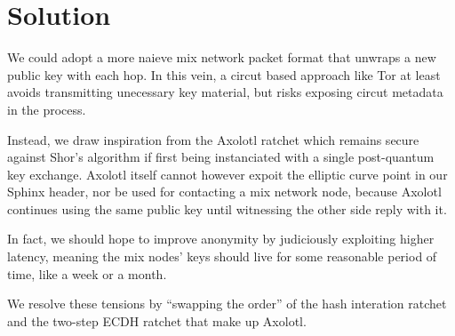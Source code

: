 \documentclass[twoside,letterpaper]{sig-alternate}
\begin{document}
\section{Solution}

We could adopt a more naieve mix network packet format that unwraps
a new public key with each hop.  In this vein, a circut based approach
like Tor at least avoids transmitting unecessary key material, but
risks exposing circut metadata in the process. 

Instead, we draw inspiration from the Axolotl ratchet %
which remains secure against Shor's algorithm if first being instanciated
with a single post-quantum key exchange. 
%
Axolotl itself cannot however expoit the elliptic curve point in
 our Sphinx header, nor be used for contacting a mix network node, 
because Axolotl continues using the same public key until witnessing
 the other side reply with it.

In fact, we should hope to improve anonymity by judiciously exploiting
higher latency, meaning the mix nodes' keys should live for some
reasonable period of time, like a week or a month.

We resolve these tensions by ``swapping the order'' of the hash interation
ratchet and the two-step ECDH ratchet that make up Axolotl.

\smallskip


\def\ck{\textrm{ck}}
\def\DH{\textrm{DH}}
\def\lk{\textrm{lk}}
\def\mk{\textrm{mk}}
\def\ECDH{\textrm{ECDH}}
\def\name{\textrm{name}}
\end{document}
